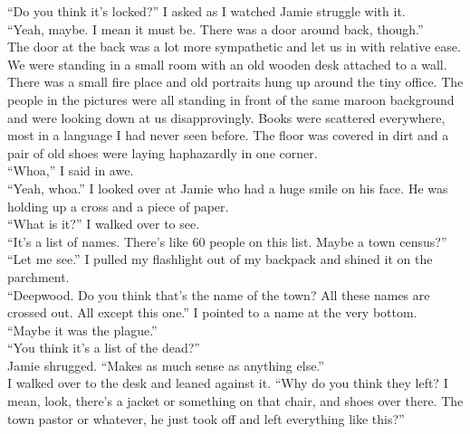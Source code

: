\documentclass[a5paper]{scrartcl}
\begin{document}
\enquote{Do you think it's locked?} I asked as I watched Jamie struggle with it.\\


\enquote{Yeah, maybe. I mean it must be. There was a door around back, though.}\\


The door at the back was a lot more sympathetic and let us in with relative ease. We were standing in a small room with an old wooden desk attached to a wall. There was a small fire place and old portraits hung up around the tiny office. The people in the pictures were all standing in front of the same maroon background and were looking down at us disapprovingly. Books were scattered everywhere, most in a language I had never seen before. The floor was covered in dirt and a pair of old shoes were laying haphazardly in one corner.\\


\enquote{Whoa,} I said in awe.\\


\enquote{Yeah, whoa.} I looked over at Jamie who had a huge smile on his face. He was holding up a cross and a piece of paper.\\


\enquote{What is it?} I walked over to see.\\


\enquote{It's a list of names. There's like 60 people on this list. Maybe a town census?}\\


\enquote{Let me see.} I pulled my flashlight out of my backpack and shined it on the parchment. \\


\enquote{Deepwood. Do you think that's the name of the town? All these names are crossed out. All except this one.} I pointed to a name at the very bottom. \\


\enquote{Maybe it was the plague.}\\


\enquote{You think it's a list of the dead?}\\


Jamie shrugged. \enquote{Makes as much sense as anything else.}\\


I walked over to the desk and leaned against it. \enquote{Why do you think they left? I mean, look, there's a jacket or something on that chair, and shoes over there. The town pastor or whatever, he just took off and left everything like this?}\\
\end{document}
